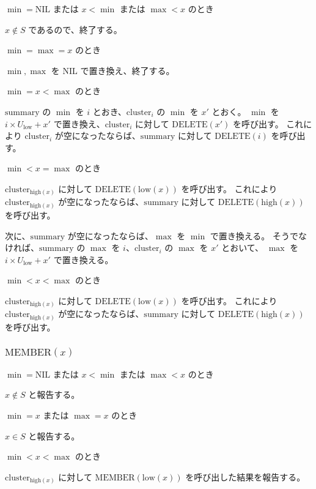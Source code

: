 \documentclass[dvipdfmx,a4j,10pt]{jarticle}
\begin{document}
\noindent [1] $\min = \mathrm{NIL}$ または $x < \min$ または $\max < x$ のとき

$x \notin S$ であるので、終了する。

\noindent [2] $\min = \max = x$ のとき

$\min, \max$ を $\mathrm{NIL}$ で置き換え、終了する。

\noindent [3] $\min = x < \max$ のとき

$\mathrm{summary}$ の $\min$ を $i$ とおき、$\mathrm{cluster}_i$ の $\min$ を $x'$ とおく。
$\min$ を $i \times U_{\mathrm{low}} + x'$ で置き換え、$\mathrm{cluster}_i$ に対して $\mathrm{DELETE}(x')$ を呼び出す。
これにより $\mathrm{cluster}_i$ が空になったならば、$\mathrm{summary}$ に対して $\mathrm{DELETE}(i)$ を呼び出す。

\noindent [4] $\min < x = \max$ のとき

$\mathrm{cluster}_{\mathrm{high}(x)}$ に対して $\mathrm{DELETE}(\mathrm{low}(x))$ を呼び出す。
これにより $\mathrm{cluster}_{\mathrm{high}(x)}$ が空になったならば、$\mathrm{summary}$ に対して $\mathrm{DELETE}({\mathrm{high}(x)})$ を呼び出す。

次に、$\mathrm{summary}$ が空になったならば、$\max$ を $\min$ で置き換える。
そうでなければ、$\mathrm{summary}$ の $\max$ を $i$、$\mathrm{cluster}_i$ の $\max$ を $x'$ とおいて、
$\max$ を $i \times U_{\mathrm{low}} + x'$ で置き換える。

\noindent [5] $\min < x < \max$ のとき

$\mathrm{cluster}_{\mathrm{high}(x)}$ に対して $\mathrm{DELETE}(\mathrm{low}(x))$ を呼び出す。
これにより $\mathrm{cluster}_{\mathrm{high}(x)}$ が空になったならば、$\mathrm{summary}$ に対して $\mathrm{DELETE}({\mathrm{high}(x)})$ を呼び出す。

\subsubsection{$\mathrm{MEMBER}(x)$}

\noindent [1] $\min = \mathrm{NIL}$ または $x < \min$ または $\max < x$ のとき

$x \notin S$ と報告する。

\noindent [2] $\min = x$ または $\max = x$ のとき

$x \in S$ と報告する。

\noindent [3] $\min < x < \max$ のとき

$\mathrm{cluster}_{\mathrm{high}(x)}$ に対して $\mathrm{MEMBER}(\mathrm{low}(x))$ を呼び出した結果を報告する。
\end{document}
